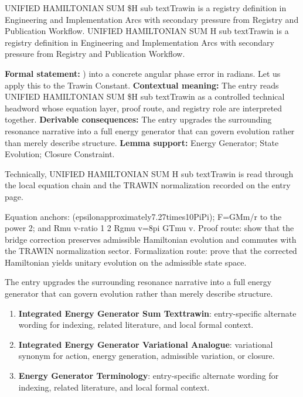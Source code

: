 
\begingroup\small
{}
UNIFIED HAMILTONIAN SUM \$H sub textTrawin is a registry definition in Engineering and Implementation Arcs with secondary pressure from Registry and Publication Workflow. UNIFIED HAMILTONIAN SUM H sub textTrawin is a registry definition in Engineering and Implementation Arcs with secondary pressure from Registry and Publication Workflow.

\begingroup\footnotesize\setlength{\emergencystretch}{3em}\sloppy
\textbf{Formal statement:} ) into a concrete angular phase error in radians. Let us apply this to the Trawin Constant. \textbf{Contextual meaning:} The entry reads UNIFIED HAMILTONIAN SUM \$H sub textTrawin as a controlled technical headword whose equation layer, proof route, and registry role are interpreted together. \textbf{Derivable consequences:} The entry upgrades the surrounding resonance narrative into a full energy generator that can govern evolution rather than merely describe structure. \textbf{Lemma support:} Energy Generator; State Evolution; Closure Constraint.\par
\endgroup

Technically, UNIFIED HAMILTONIAN SUM H sub textTrawin is read through the local equation chain and the TRAWIN normalization recorded on the entry page.

Equation anchors: (epsilonapproximately7.27times10PiPi); F=GMm/r to the power 2; and Rmu v-ratio 1 2 Rgmu v=8pi GTmu v. Proof route: show that the bridge correction preserves admissible Hamiltonian evolution and commutes with the TRAWIN normalization sector. Formalization route: prove that the corrected Hamiltonian yields unitary evolution on the admissible state space.

The entry upgrades the surrounding resonance narrative into a full energy generator that can govern evolution rather than merely describe structure.
\endgroup

\begin{enumerate}[leftmargin=1.6em,itemsep=6pt,topsep=4pt]
\item \textbf{Integrated Energy Generator Sum Texttrawin}: entry-specific alternate wording for indexing, related literature, and local formal context.
\item \textbf{Integrated Energy Generator Variational Analogue}: variational synonym for action, energy generation, admissible variation, or closure.
\item \textbf{Energy Generator Terminology}: entry-specific alternate wording for indexing, related literature, and local formal context.
\end{enumerate}


